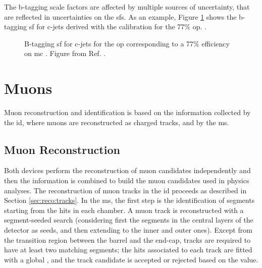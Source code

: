The b-tagging scale factors are affected by multiple sources of uncertainty, that are reflected in uncertainties on the \glspl{sf}.
As an example, Figure \ref{fig:obj:btagSF} shows the b-tagging \gls{sf} for c-jets derived with the \ttbar calibration for the
77\% \gls{op}. .

\begin{figure}[h]
\begin{center}
\end{center}
 \caption{B-tagging \gls{sf} for c-jets for the \gls{op} corresponding to a 77\% efficiency on \gls{mc} \ttbar. Figure from Ref. \cite{ATLAS:2018bpl}.}
  \label{fig:obj:btagSF}
\end{figure}


\section{Muons}

Muon reconstruction and identification \cite{Aad:2016jkr} is based on the information collected by the \gls{id}, where muons are reconstructed as charged tracks, and by the \gls{ms}. 

\subsection{Muon Reconstruction}

Both devices perform the reconstruction
of muon candidates independently and then the information is combined to build the muon candidates used in physics analyses. 
The reconstruction of muon tracks in the \gls{id} proceeds as described in Section \ref{sec:reco:tracks}. In the \gls{ms}, the first step is the identification of segments starting from the hits in each chamber. A muon track is reconstructed with a segment-seeded search (considering first the segments in the central layers of the detector as seeds, and then extending to the inner and outer ones). Except from the transition region between the barrel and the end-cap, tracks are required to have at least two matching segments; the hits associated to each track are fitted with a global \chis, and the track candidate is accepted or rejected based on the \chis value. 


